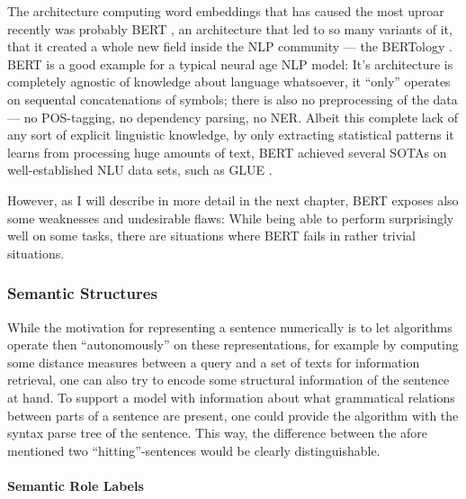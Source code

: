 The architecture computing word embeddings that has caused the most uproar
recently was probably BERT \cite{devlin2018bert}, an architecture that led
to so many variants of it, that it created a whole new field inside the NLP
community --- the BERTology \cite{rogers2020primer}. BERT is a good example
for a typical neural age NLP model: It's architecture is completely agnostic
of knowledge about language whatsoever, it ``only'' operates on sequental
concatenations of symbols; there is also no preprocessing of the data --- no
POS-tagging, no dependency parsing, no NER.
Albeit this complete lack of any sort of explicit linguistic knowledge, by
only extracting statistical patterns it learns from processing huge amounts
of text, BERT achieved several SOTAs on well-established NLU data sets, such
as GLUE \cite{wang2018glue}.

However, as I will describe in more detail in the next chapter, BERT exposes also
some weaknesses and undesirable flaws: While being able to perform surprisingly well
on some tasks, there are situations where BERT fails in rather trivial situations.



\subsubsection*{Semantic Structures}

While the motivation for representing a sentence numerically is to let algorithms operate
then ``autonomously'' on these representations, for example by computing some distance measures
between a query and a set of texts for information retrieval, one can also try to encode
some structural information of the sentence at hand.
To support a model with information about what grammatical relations between
parts of a sentence are present, one could provide the algorithm with the syntax parse
tree of the sentence. This way, the difference between the afore mentioned
two ``hitting''-sentences would be clearly distinguishable.

\paragraph*{Semantic Role Labels}

